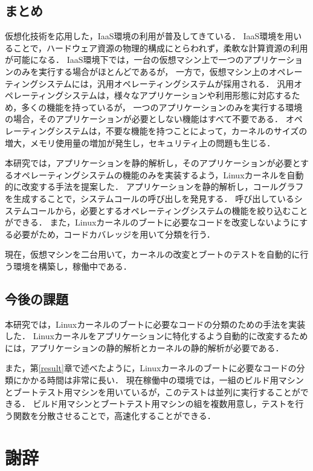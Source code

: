 \documentclass[graduation-thesis]{mlarticle}
\begin{document}
\subsection{まとめ}
仮想化技術を応用した，IaaS環境の利用が普及してきている．
IaaS環境を用いることで，ハードウェア資源の物理的構成にとらわれず，柔軟な計算資源の利用が可能になる．
IaaS環境下では，一台の仮想マシン上で一つのアプリケーションのみを実行する場合がほとんどであるが，
一方で，仮想マシン上のオペレーティングシステムには，汎用オペレーティングシステムが採用される．
汎用オペレーティングシステムは，様々なアプリケーションや利用形態に対応するため，多くの機能を持っているが，
一つのアプリケーションのみを実行する環境の場合，そのアプリケーションが必要としない機能はすべて不要である．
オペレーティングシステムは，不要な機能を持つことによって，カーネルのサイズの増大，メモリ使用量の増加が発生し，セキュリティ上の問題も生じる．

本研究では，アプリケーションを静的解析し，そのアプリケーションが必要とするオペレーティングシステムの機能のみを実装するよう，Linuxカーネルを自動的に改変する手法を提案した．
アプリケーションを静的解析し，コールグラフを生成することで，システムコールの呼び出しを発見する．
呼び出しているシステムコールから，必要とするオペレーティングシステムの機能を絞り込むことができる．
また，Linuxカーネルのブートに必要なコードを改変しないようにする必要がため，コードカバレッジを用いて分類を行う．

現在，仮想マシンを二台用いて，カーネルの改変とブートのテストを自動的に行う環境を構築し，稼働中である．

\subsection{今後の課題}

本研究では，Linuxカーネルのブートに必要なコードの分類のための手法を実装した．
Linuxカーネルをアプリケーションに特化するよう自動的に改変するためには，アプリケーションの静的解析とカーネルの静的解析が必要である．

また，第\ref{result}章で述べたように，Linuxカーネルのブートに必要なコードの分類にかかる時間は非常に長い．
現在稼働中の環境では，一組のビルド用マシンとブートテスト用マシンを用いているが，このテストは並列に実行することができる．
ビルド用マシンとブートテスト用マシンの組を複数用意し，テストを行う関数を分散させることで，高速化することができる．


\clearpage
\section{謝辞}
\label{sec-8}
\clearpage



\end{document}
